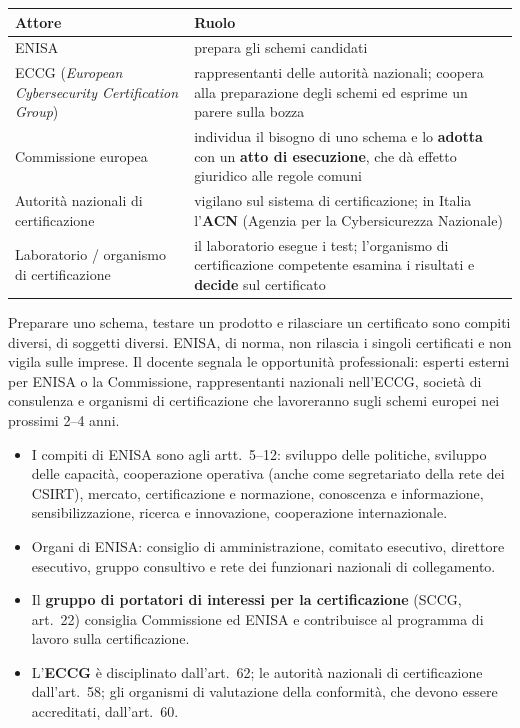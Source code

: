 \begin{center}
\small
\begin{tabularx}{\linewidth}{>{\raggedright\arraybackslash}p{4.2cm} X}
\toprule
\textbf{Attore} & \textbf{Ruolo}\\
\midrule
ENISA & prepara gli schemi candidati\\
ECCG (\emph{European Cybersecurity Certification Group}) & rappresentanti delle autorità nazionali;
  coopera alla preparazione degli schemi ed esprime un parere sulla bozza\\
Commissione europea & individua il bisogno di uno schema e lo \textbf{adotta} con un \textbf{atto di
  esecuzione}, che dà effetto giuridico alle regole comuni\\
Autorità nazionali di certificazione & vigilano sul sistema di certificazione; in Italia l'\textbf{ACN}
  (Agenzia per la Cybersicurezza Nazionale)\\
Laboratorio / organismo di certificazione & il laboratorio esegue i test; l'organismo di certificazione
  competente esamina i risultati e \textbf{decide} sul certificato\\
\bottomrule
\end{tabularx}
\end{center}
Preparare uno schema, testare un prodotto e rilasciare un certificato sono compiti diversi, di soggetti
diversi. ENISA, di norma, non rilascia i singoli certificati e non vigila sulle imprese.
Il docente segnala le opportunità professionali: esperti esterni per ENISA o la Commissione,
rappresentanti nazionali nell'ECCG, società di consulenza e organismi di certificazione che lavoreranno
sugli schemi europei nei prossimi 2--4 anni.

\begin{integrazione}
\begin{itemize}
  \item I compiti di ENISA sono agli artt.~5--12: sviluppo delle politiche, sviluppo delle capacità,
    cooperazione operativa (anche come segretariato della rete dei CSIRT), mercato, certificazione e
    normazione, conoscenza e informazione, sensibilizzazione, ricerca e innovazione, cooperazione
    internazionale.
  \item Organi di ENISA: consiglio di amministrazione, comitato esecutivo, direttore esecutivo, gruppo
    consultivo e rete dei funzionari nazionali di collegamento.
  \item Il \textbf{gruppo di portatori di interessi per la certificazione} (SCCG, art.~22) consiglia
    Commissione ed ENISA e contribuisce al programma di lavoro sulla certificazione.
  \item L'\textbf{ECCG} è disciplinato dall'art.~62; le autorità nazionali di certificazione dall'art.~58;
    gli organismi di valutazione della conformità, che devono essere accreditati, dall'art.~60.
\end{itemize}
\end{integrazione}

